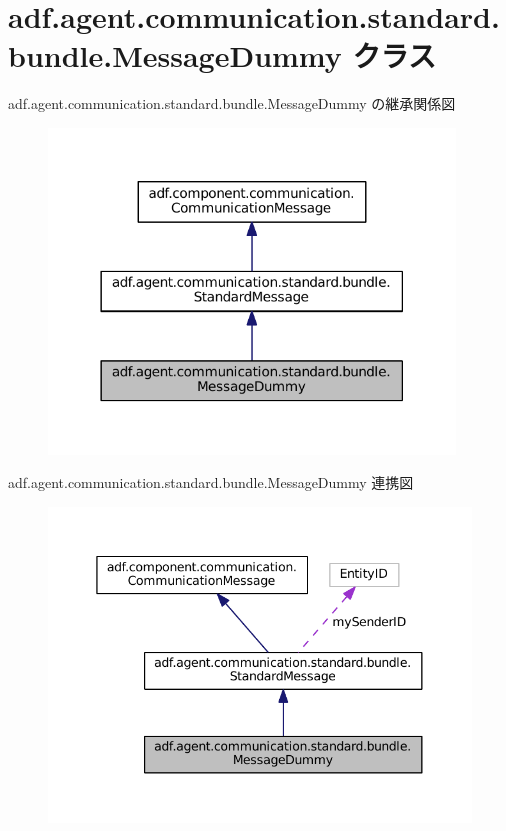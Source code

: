 \hypertarget{classadf_1_1agent_1_1communication_1_1standard_1_1bundle_1_1MessageDummy}{}\section{adf.\+agent.\+communication.\+standard.\+bundle.\+Message\+Dummy クラス}
\label{classadf_1_1agent_1_1communication_1_1standard_1_1bundle_1_1MessageDummy}


adf.\+agent.\+communication.\+standard.\+bundle.\+Message\+Dummy の継承関係図
\nopagebreak
\begin{figure}[H]
\begin{center}
\leavevmode
\includegraphics[width=306pt]{classadf_1_1agent_1_1communication_1_1standard_1_1bundle_1_1MessageDummy__inherit__graph}
\end{center}
\end{figure}


adf.\+agent.\+communication.\+standard.\+bundle.\+Message\+Dummy 連携図
\nopagebreak
\begin{figure}[H]
\begin{center}
\leavevmode
\includegraphics[width=345pt]{classadf_1_1agent_1_1communication_1_1standard_1_1bundle_1_1MessageDummy__coll__graph}
\end{center}
\end{figure}
